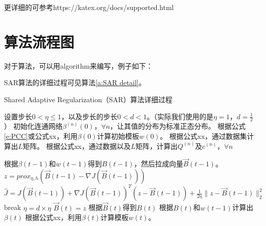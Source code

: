 更详细的可参考https://katex.org/docs/supported.html



\section{算法流程图}
对于算法，可以用algorithm来编写，例子如下：

SAR算法的详细过程可见算法\ref{a:SAR detail}。
\begin{algorithm}[htbp]
    \caption{Shared Adaptive Regularization（SAR）算法详细过程}
    \label{a:SAR detail}
    \begin{algorithmic}[1]
    \State 设置步长$0<\eta\leq 1$，以及步长的步长$0<d<1$。（实际我们使用的是$\eta=1$，$d=\frac{1}{2}$）
    \State 初始化连通网络$\beta^{(n)}(0)$，$\forall n$，让其值的分布为标准正态分布。
    \State 根据公式\ref{e:PCC}或公式xx，利用$\beta(0)$计算初始模板$w(0)$。
    \State 根据公式xx，通过数据集计算出$L$矩阵。
    \State 根据公式xx，通过数据以及$L$矩阵，计算出$Q^{(n)}$及$c^{(n)}$，$\forall n$

        \State 根据$\beta(t-1)$和$w(t-1)$得到$B(t-1)$，然后拉成向量$\vec{B}(t-1)$。
        \State $z=prox_{\eta,h}\left( \vec{B}(t-1)- \nabla J(\vec{B}(t-1))\right)$
        \State $\hat{J}=J\left(\vec{B}(t-1)\right)+\nabla J\left( \vec{B}(t-1)\right)^T\left(z-\vec{B}(t-1)\right)+\frac{1}{2\eta}\|z-\vec{B}(t-1)\|_2^2$
        \State break
        \EndIf
        \State $\eta=d\times \eta$
        \EndWhile
    \State $\vec{B}(t)=z$
    \State 根据$\vec{B}(t)$得到$B(t)$
    \State 根据$B(t)$和$w(t-1)$计算出$\beta(t)$
    \State 根据公式xx，利用$\beta(t)$计算模板$w(t)$。
    \EndFor
    \State {}
    \end{algorithmic}
  \end{algorithm}

